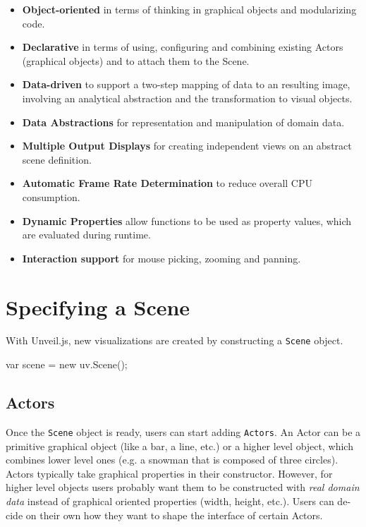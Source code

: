\begin{english}
\begin{itemize}
\item
  \textbf{Object-oriented} in terms of thinking in graphical objects and modularizing code.
\item
  \textbf{Declarative} in terms of using, configuring and combining existing Actors (graphical objects) and to attach them to the Scene.
\item
  \textbf{Data-driven} to support a two-step mapping of data to an resulting image, involving an analytical abstraction and the transformation to visual objects.
\item
  \textbf{Data Abstractions} for representation and manipulation of domain data.
\item
  \textbf{Multiple Output Displays} for creating independent views on an abstract scene definition.
\item
  \textbf{Automatic Frame Rate Determination} to reduce overall CPU consumption.
\item
  \textbf{Dynamic Properties} allow functions to be used as property values, which are evaluated during runtime.
\item
  \textbf{Interaction support} for mouse picking, zooming and panning.
\end{itemize}


\section{Specifying a Scene}

With Unveil.js, new visualizations are created by constructing a \texttt{Scene} object.


\begin{program}
\begin{CppSourceCode}
var scene = new uv.Scene();
\end{CppSourceCode}
\end{program}

\subsection{Actors}

Once the \texttt{Scene} object is ready, users can start adding \texttt{Actors}. An Actor can be a primitive graphical object (like a bar, a line, etc.) or a higher level object, which combines lower level ones (e.g. a snowman that is composed of three circles). Actors typically take graphical properties in their constructor. However, for higher level objects users probably want them to be constructed with \emph{real domain data} instead of graphical oriented properties (width, height, etc.). Users can decide on their own how they want to shape the interface of certain Actors.


\end{english}
